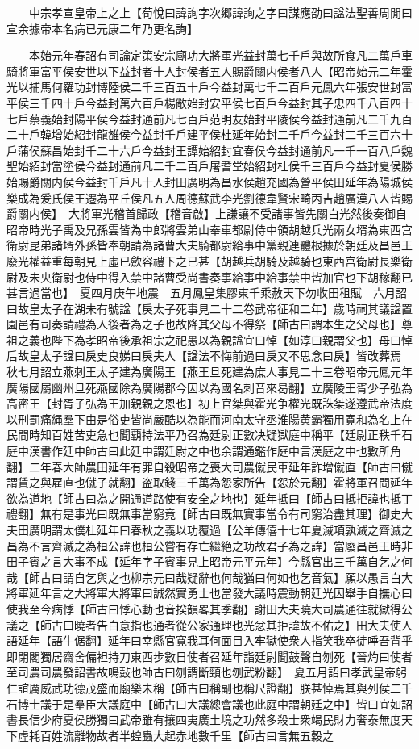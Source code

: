 　　中宗孝宣皇帝上之上【荀悅曰諱詢字次郷諱詢之字曰謀應劭曰諡法聖善周閒曰宣余據帝本名病已元康二年乃更名詢】

　　本始元年春詔有司論定策安宗廟功大將軍光益封萬七千戶與故所食凡二萬戶車騎將軍富平侯安世以下益封者十人封侯者五人賜爵關内侯者八人【昭帝始元二年霍光以捕馬何羅功封博陸侯二千三百五十戶今益封萬七千二百戶元鳳六年張安世封富平侯三千四十戶今益封萬六百戶楊敞始封安平侯七百戶今益封其子忠四千八百四十七戶蔡義始封陽平侯今益封通前凡七百戶范明友始封平陵侯今益封通前凡二千九百二十戶韓增始紹封龍雒侯今益封千戶建平侯杜延年始封二千戶今益封二千三百六十戶蒲侯蘇昌始封千二十六戶今益封王譚始紹封宜春侯今益封通前凡一千一百八戶魏聖始紹封當塗侯今益封通前凡二千二百戶屠耆堂始紹封杜侯千三百戶今益封夏侯勝始賜爵關内侯今益封千戶凡十人封田廣明為昌水侯趙充國為營平侯田延年為陽城侯樂成為爰氏侯王遷為平丘侯凡五人周德蘇武李光劉德韋賢宋畸丙吉趙廣漢八人皆賜爵關内侯】　大將軍光稽首歸政【稽音啟】上謙讓不受諸事皆先關白光然後奏御自昭帝時光子禹及兄孫雲皆為中郎將雲弟山奉車都尉侍中領胡越兵光兩女壻為東西宫衛尉昆弟諸壻外孫皆奉朝請為諸曹大夫騎都尉給事中黨親連體根據於朝廷及昌邑王廢光權益重每朝見上虛已歛容禮下之已甚【胡越兵胡騎及越騎也東西宫衛尉長樂衛尉及未央衛尉也侍中得入禁中諸曹受尚書奏事給事中給事禁中皆加官也下胡稼翻已甚言過當也】　夏四月庚午地震　五月鳳皇集膠東千乘赦天下勿收田租賦　六月詔曰故皇太子在湖未有號諡【戾太子死事見二十二卷武帝征和二年】歲時祠其議諡置園邑有司奏請禮為人後者為之子也故降其父母不得祭【師古曰謂本生之父母也】尊祖之義也陛下為孝昭帝後承祖宗之祀愚以為親諡宜曰悼【如淳曰親謂父也】母曰悼后故皇太子諡曰戾史良娣曰戾夫人【諡法不悔前過曰戾又不思念曰戾】皆改葬焉　秋七月詔立燕刺王太子建為廣陽王【燕王旦死建為庶人事見二十三卷昭帝元鳳元年廣陽國屬幽州旦死燕國除為廣陽郡今因以為國名刺音來曷翻】立廣陵王胥少子弘為高密王【封胥子弘為王加親親之恩也】初上官桀與霍光争權光既誅桀遂遵武帝法度以刑罰痛䋲羣下由是俗吏皆尚嚴酷以為能而河南太守丞淮陽黄霸獨用寛和為名上在民間時知百姓苦吏急也聞覇持法平乃召為廷尉正數决疑獄庭中稱平【廷尉正秩千石庭中漢書作廷中師古曰此廷中謂廷尉之中也余謂通鑑作庭中言漢庭之中也數所角翻】二年春大師農田延年有罪自殺昭帝之喪大司農僦民車延年詐增僦直【師古曰僦謂賃之與雇直也僦子就翻】盗取錢三千萬為怨家所告【怨於元翻】霍將軍召問延年欲為道地【師古曰為之開通道路使有安全之地也】延年抵曰【師古曰抵拒諱也抵丁禮翻】無有是事光曰既無事當窮竟【師古曰既無實事當令有司窮治盡其理】御史大夫田廣明謂太僕杜延年曰春秋之義以功覆過【公羊傳僖十七年夏滅項孰滅之齊滅之昌為不言齊滅之為桓公諱也桓公嘗有存亡繼絶之功故君子為之諱】當廢昌邑王時非田子賓之言大事不成【延年字子賓事見上昭帝元平元年】今縣官出三千萬自乞之何哉【師古曰謂自乞與之也柳宗元曰哉疑辭也何哉猶曰何如也乞音氣】願以愚言白大將軍延年言之大將軍大將軍曰誠然實勇士也當發大議時震動朝廷光因舉手自撫心曰使我至今病悸【師古曰悸心動也音揆韻畧其季翻】謝田大夫曉大司農通往就獄得公議之【師古曰曉者告白意指也通者從公家通理也光忿其拒諱故不佑之】田大夫使人語延年【語牛倨翻】延年曰幸縣官寛我耳何面目入牢獄使衆人指笑我卒徒唾吾背乎即閉閣獨居齋舍偏袒持刀東西步數日使者召延年詣廷尉聞鼓聲自刎死【晉灼曰使者至司農司農發詔書故鳴鼔也師古曰刎謂斷頸也刎武粉翻】　夏五月詔曰孝武皇帝躬仁誼厲威武功德茂盛而廟樂未稱【師古曰稱副也稱尺證翻】朕甚悼焉其與列侯二千石博士議于是羣臣大議庭中【師古曰大議總會議也此庭中謂朝廷之中】皆曰宜如詔書長信少府夏侯勝獨曰武帝雖有攘四夷廣土境之功然多殺士衆竭民財力奢泰無度天下虛耗百姓流離物故者半蝗蟲大起赤地數千里【師古曰言無五穀之